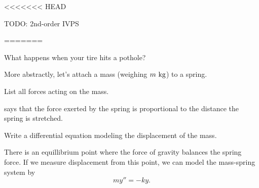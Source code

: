 
\begin{applicationActivities}

<<<<<<< HEAD
\begin{remark}TODO: 2nd-order IVPS\end{remark}
%
%
%
=======
\begin{observation}
What happens when your tire hits a pothole?



\end{observation}

\begin{activity}{5}
More abstractly, let's attach a mass (weighing \(m\ {\rm kg}\)) to a spring.

\begin{center}
\springmass
\end{center}
\vfill
List all forces acting on the mass.
\end{activity}

\begin{activity}{5}
 says that the force exerted by the spring is proportional to the distance the spring is stretched.

\begin{center}
\springmass
\end{center}
\vfill
Write a differential equation modeling the displacement of the mass.
\end{activity}

\begin{observation}
There is an equillibrium point where the force of gravity balances the spring force.  If we measure displacement from this point, we can model the mass-spring system by
\[my''=-ky.\]
\vfill
\begin{center}
\springmass
\end{center}
\end{observation}


\end{applicationActivities}
